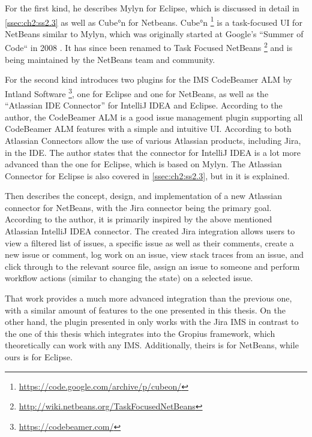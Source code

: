For the first kind, he describes Mylyn for \gls{Eclipse}, which is discussed in detail in \cref{ssec:ch2:ss2.3} as well as Cube°n for Netbeans.
Cube°n \footnote{\url{https://code.google.com/archive/p/cubeon/}} is a task-focused \gls{UI} for NetBeans similar to Mylyn, which was originally started at Google's ``Summer of Code`` in 2008 \cite{janak2009issue}.
It has since been renamed to Task Focused NetBeans \footnote{\url{http://wiki.netbeans.org/TaskFocusedNetBeans}} and is being maintained by the NetBeans team and community.

For the second kind \cite{janak2009issue} introduces two plugins for the \gls{IMS} CodeBeamer ALM by Intland Software \footnote{\url{https://codebeamer.com/}}, one for \gls{Eclipse} and one for NetBeans, as well as the ``Atlassian IDE Connector'' for IntelliJ IDEA and \gls{Eclipse}.
According to the author, the CodeBeamer ALM is a good issue management plugin supporting all CodeBeamer ALM features with a simple and intuitive \gls{UI}.
According to \cite{janak2009issue} both Atlassian Connectors allow the use of various Atlassian products, including Jira, in the \gls{IDE}.
The author states that the connector for IntelliJ IDEA is a lot more advanced than the one for \gls{Eclipse}, which is based on Mylyn.
The Atlassian Connector for \gls{Eclipse} is also covered in \cref{ssec:ch2:ss2.3}, but in \cite{janak2009issue} it is explained.

Then \cite{janak2009issue} describes the concept, design, and implementation of a new Atlassian connector for NetBeans, with the Jira connector being the primary goal.
According to the author, it is primarily inspired by the above mentioned Atlassian IntelliJ IDEA connector.
The created Jira integration allows users to view a filtered list of issues, a specific issue as well as their comments, create a new issue or comment, log work on an issue, view stack traces from an issue, and click through to the relevant source file, assign an issue to someone and perform workflow actions (similar to changing the state) on a selected issue.

That work provides a much more advanced integration than the previous one, with a similar amount of features to the one presented in this thesis.
On the other hand, the plugin presented in \cite{janak2009issue} only works with the Jira \gls{IMS} in contrast to the one of this thesis which integrates into the \gls{Gropius} framework, which theoretically can work with any \gls{IMS}.
Additionally, theirs is for NetBeans, while ours is for \gls{Eclipse}.

